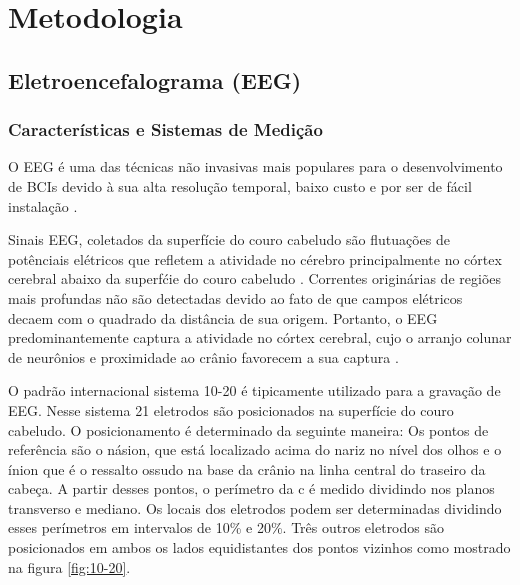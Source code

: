 \chapter{Metodologia} \label{label_revisao_bib}
\section{Eletroencefalograma (EEG)}
\subsection{Caracter\'isticas e Sistemas de Medi\c{c}\~ao}
\par
O \ac{EEG} \'e uma das t\'ecnicas n\~ao invasivas mais populares para o desenvolvimento de \ac{BCIs} devido \`a sua alta resolu\c{c}\~ao temporal, baixo custo e por ser de f\'acil instala\c{c}\~ao \cite{RAO}.
\par
Sinais \ac{EEG}, coletados da superf\'icie do couro cabeludo s\~ao flutua\c{c}\~oes de pot\^enciais el\'etricos que refletem a atividade no c\'erebro  principalmente no c\'ortex cerebral abaixo da superf\'cie do couro cabeludo \cite{Vidal77}.
Correntes origin\'arias de regi\~oes mais profundas n\~ao s\~ao detectadas devido ao fato de que campos el\'etricos decaem com o quadrado da dist\^ancia de sua origem.
Portanto, o \ac{EEG} predominantemente captura a atividade no c\'ortex cerebral, cujo o arranjo colunar de neur\^onios e proximidade ao cr\^anio favorecem a sua captura \cite{RAO}.
\par
O padrão internacional sistema 10-20 é tipicamente utilizado para a gravação de \ac{EEG}. Nesse sistema 21 eletrodos são posicionados na superfície do couro cabeludo.
O posicionamento é determinado da seguinte maneira: Os pontos de referência são o n\'asion, que está localizado acima do nariz no nível dos olhos e o ínion que é o ressalto ossudo na base da cr\^anio na linha central do traseiro da cabeça. A partir desses pontos, o perímetro da c é medido dividindo nos planos transverso e mediano. Os locais dos eletrodos podem ser determinadas dividindo esses perímetros em intervalos de 10\% e 20\%. Três outros eletrodos são posicionados em ambos os lados equidistantes dos pontos vizinhos como mostrado na figura \ref{fig:10-20}. \cite{EEGPrinciple}

